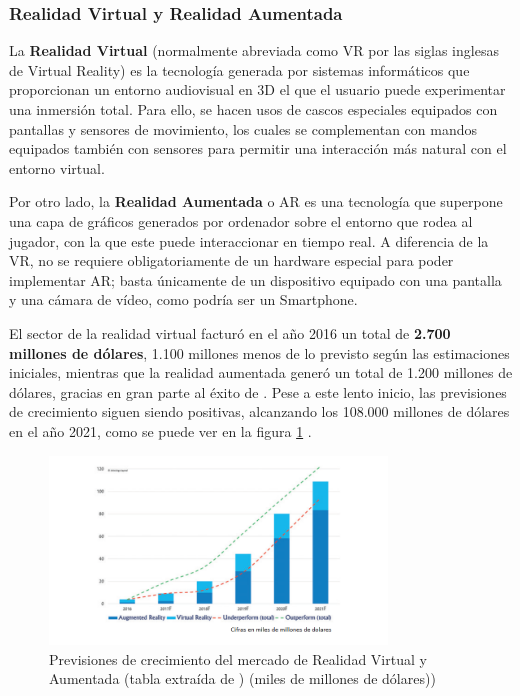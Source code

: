 \subsubsection{Realidad Virtual y Realidad Aumentada}
La \textbf{Realidad Virtual} (normalmente abreviada como VR por las siglas inglesas de Virtual Reality) es la tecnología generada por sistemas informáticos que proporcionan un entorno audiovisual en 3D el que el usuario puede experimentar una inmersión total. Para ello, se hacen usos de cascos especiales equipados con pantallas y sensores de movimiento, los cuales se complementan con mandos equipados también con sensores para permitir una interacción más natural con el entorno virtual.

Por otro lado, la \textbf{Realidad Aumentada} o AR es una tecnología que superpone una capa de gráficos generados por ordenador sobre el entorno que rodea al jugador, con la que este puede interaccionar en tiempo real. A diferencia de la VR, no se requiere obligatoriamente de un hardware especial para poder implementar AR; basta únicamente de un dispositivo equipado con una pantalla y una cámara de vídeo, como podría ser un Smartphone.

El sector de la realidad virtual facturó en el año 2016 un total de \textbf{2.700 millones de dólares}, 1.100 millones menos de lo previsto según las estimaciones iniciales, mientras que la realidad aumentada generó un total de 1.200 millones de dólares, gracias en gran parte al éxito de . Pese a este lento inicio, las previsiones de crecimiento siguen siendo positivas, alcanzando los 108.000 millones de dólares en el año 2021, como se puede ver en la figura \ref{crecimiento-vr} \cite{libro_blanco}.

\begin{figure}[h]
    \centering
    \includegraphics[width=0.8\textwidth]{images/estadodelarte/mercado/crecimiento-vr}
    \caption{Previsiones de crecimiento del mercado de Realidad Virtual y Aumentada (tabla extraída de \cite{libro_blanco})
(miles de millones de dólares))}
    \label{crecimiento-vr}
\end{figure}


